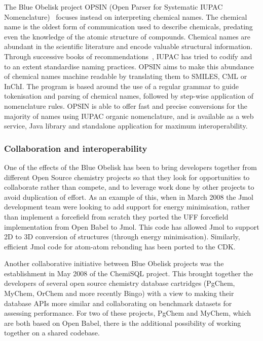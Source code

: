 \documentclass[10pt]{bmc_article}
\newenvironment{bmcformat}{\begin{raggedright}\baselineskip20pt\sloppy\setboolean{publ}{false}}{\end{raggedright}\baselineskip20pt\sloppy}
\begin{document}
\begin{bmcformat}
The Blue Obelisk project OPSIN (Open Parser for Systematic IUPAC
Nomenclature)~\cite{lowe_chemical_2011} focuses instead on interpreting chemical names.
The chemical name is the oldest form of communication used to
describe chemicals, predating
even the knowledge of the atomic structure of compounds.
Chemical names are abundant in the scientific
literature and encode valuable structural information.
Through successive books of
recommendations~\cite{iupac_nomenclature_1979, iupac_guide_1993},
IUPAC has tried to codify and to an extent standardise naming practices.
OPSIN aims to make this abundance of
chemical names machine readable by translating them to SMILES, CML or
InChI. The program is based around the use of a regular grammar to
guide tokenisation and parsing of chemical names, followed by
step-wise application of nomenclature rules. OPSIN is able to offer
fast and precise conversions for the majority of names using IUPAC
organic nomenclature, and is available as a web service, Java
library and standalone application for maximum interoperability.

  \subsubsection*{Collaboration and interoperability}

One of the effects of the Blue Obelisk has been to bring developers
together from different Open Source chemistry projects so that they
look for opportunities to collaborate rather than compete, and to
leverage work done by other projects to avoid duplication of effort.
As an example of this, when in March 2008 the Jmol development team
were looking to add support for energy minimisation, rather than
implement a forcefield from scratch they ported the UFF forcefield
implementation from Open Babel to Jmol. This code has allowed Jmol to
support 2D to 3D conversion of structures (through energy
minimisation). Similarly, efficient Jmol code for atom-atom rebonding
has been ported to the CDK.

Another collaborative initiative between Blue Obelisk projects was the establishment in May 2008 of
the ChemiSQL project. This brought together the developers of several
open source chemistry database cartridges (PgChem, MyChem, OrChem and
more recently Bingo) with a view to making their database APIs more
similar and collaborating on benchmark datasets for assessing
performance. For two of these projects, PgChem and MyChem, which are both based on
Open Babel, there is the additional possibility of working together on a shared
codebase.


\end{bmcformat}
\end{document}

